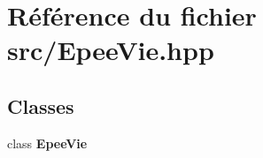 \section{Référence du fichier src/\-Epee\-Vie.hpp}
\label{_epee_vie_8hpp}
\subsection*{Classes}
\begin{DoxyCompactItemize}
\item 
class {\bf Epee\-Vie}
\end{DoxyCompactItemize}
